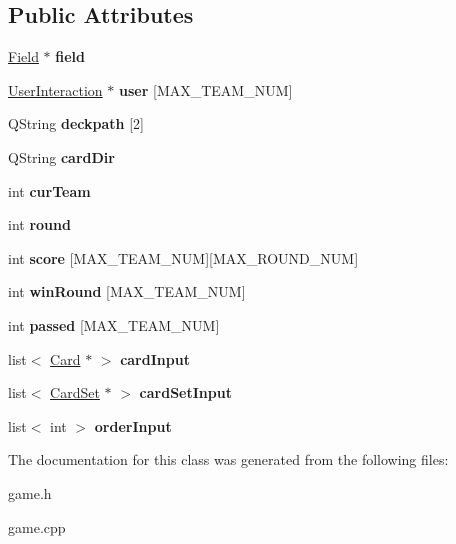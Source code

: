 \subsection*{Public Attributes}
\begin{DoxyCompactItemize}
\item 
\mbox{\label{class_game_a3cae3709d3d57b9f128e3eb98c84ba32}} 
\hyperlink{class_field}{Field} $\ast$ {\bfseries field}
\item 
\mbox{\label{class_game_a0bcdbe1720c9f053b48ca1e603d78ef3}} 
\hyperlink{class_user_interaction}{User\+Interaction} $\ast$ {\bfseries user} \mbox{[}M\+A\+X\+\_\+\+T\+E\+A\+M\+\_\+\+N\+UM\mbox{]}
\item 
\mbox{\label{class_game_a868bd58affa0cff32e3adb229e454bf1}} 
Q\+String {\bfseries deckpath} \mbox{[}2\mbox{]}
\item 
\mbox{\label{class_game_af13900cf8080e61eb5dc257653bb3928}} 
Q\+String {\bfseries card\+Dir}
\item 
\mbox{\label{class_game_a99d07be4a79a71f986f59b09e98c5006}} 
int {\bfseries cur\+Team}
\item 
\mbox{\label{class_game_a9087c3cd44012a3f321bea7cac6e243c}} 
int {\bfseries round}
\item 
\mbox{\label{class_game_ad3199bedc32504d5f56019289ca02b73}} 
int {\bfseries score} \mbox{[}M\+A\+X\+\_\+\+T\+E\+A\+M\+\_\+\+N\+UM\mbox{]}\mbox{[}M\+A\+X\+\_\+\+R\+O\+U\+N\+D\+\_\+\+N\+UM\mbox{]}
\item 
\mbox{\label{class_game_ad521168cca3db47e9eb96223e13ef428}} 
int {\bfseries win\+Round} \mbox{[}M\+A\+X\+\_\+\+T\+E\+A\+M\+\_\+\+N\+UM\mbox{]}
\item 
\mbox{\label{class_game_a1ca42dbcccd79399445577e2fed0e49f}} 
int {\bfseries passed} \mbox{[}M\+A\+X\+\_\+\+T\+E\+A\+M\+\_\+\+N\+UM\mbox{]}
\item 
\mbox{\label{class_game_a00ab5d9b77844791934ee8cc1fdbd07f}} 
list$<$ \hyperlink{class_card}{Card} $\ast$ $>$ {\bfseries card\+Input}
\item 
\mbox{\label{class_game_a9e7f61bf7e7499b41f65e1d4fac10c7b}} 
list$<$ \hyperlink{class_card_set}{Card\+Set} $\ast$ $>$ {\bfseries card\+Set\+Input}
\item 
\mbox{\label{class_game_aba73af76bd69cae2248361ab83f41c06}} 
list$<$ int $>$ {\bfseries order\+Input}
\end{DoxyCompactItemize}


The documentation for this class was generated from the following files\+:\begin{DoxyCompactItemize}
\item 
game.\+h\item 
game.\+cpp\end{DoxyCompactItemize}

